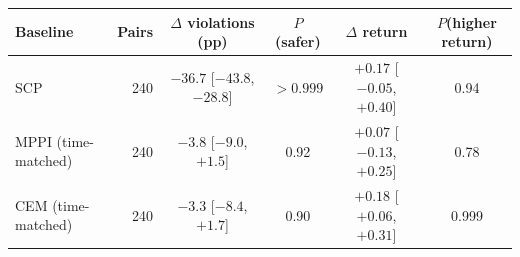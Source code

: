 \begin{tabular}{lrcccc}
\toprule
Baseline & Pairs & $\Delta$ violations (pp) & $P$(safer) & $\Delta$ return & $P$(higher return) \\
\midrule
SCP & 240 & $-36.7$ [$-43.8$, $-28.8$] & $>0.999$ & $+0.17$ [$-0.05$, $+0.40$] & 0.94 \\
MPPI (time-matched) & 240 & $-3.8$ [$-9.0$, $+1.5$] & 0.92 & $+0.07$ [$-0.13$, $+0.25$] & 0.78 \\
CEM (time-matched) & 240 & $-3.3$ [$-8.4$, $+1.7$] & 0.90 & $+0.18$ [$+0.06$, $+0.31$] & 0.999 \\
\bottomrule
\end{tabular}
